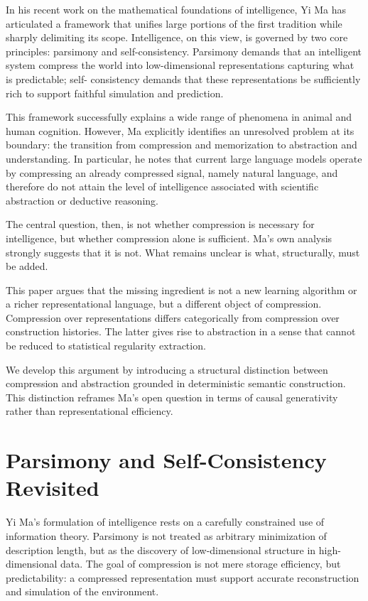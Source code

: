 \documentclass[11pt]{article}
\begin{document}
In his recent work on the mathematical foundations of intelligence, Yi Ma
has articulated a framework that unifies large portions of the first
tradition while sharply delimiting its scope. Intelligence, on this view,
is governed by two core principles: parsimony and self-consistency.
Parsimony demands that an intelligent system compress the world into
low-dimensional representations capturing what is predictable; self-
consistency demands that these representations be sufficiently rich to
support faithful simulation and prediction.

This framework successfully explains a wide range of phenomena in animal
and human cognition. However, Ma explicitly identifies an unresolved
problem at its boundary: the transition from compression and memorization
to abstraction and understanding. In particular, he notes that current
large language models operate by compressing an already compressed signal,
namely natural language, and therefore do not attain the level of
intelligence associated with scientific abstraction or deductive
reasoning.

The central question, then, is not whether compression is necessary for
intelligence, but whether compression alone is sufficient. Ma’s own
analysis strongly suggests that it is not. What remains unclear is what,
structurally, must be added.

This paper argues that the missing ingredient is not a new learning
algorithm or a richer representational language, but a different object
of compression. Compression over representations differs categorically
from compression over construction histories. The latter gives rise to
abstraction in a sense that cannot be reduced to statistical regularity
extraction.

We develop this argument by introducing a structural distinction between
compression and abstraction grounded in deterministic semantic
construction. This distinction reframes Ma’s open question in terms of
causal generativity rather than representational efficiency.

\section{Parsimony and Self-Consistency Revisited}

Yi Ma’s formulation of intelligence rests on a carefully constrained use
of information theory. Parsimony is not treated as arbitrary minimization
of description length, but as the discovery of low-dimensional structure
in high-dimensional data. The goal of compression is not mere storage
efficiency, but predictability: a compressed representation must support
accurate reconstruction and simulation of the environment.
\end{document}
